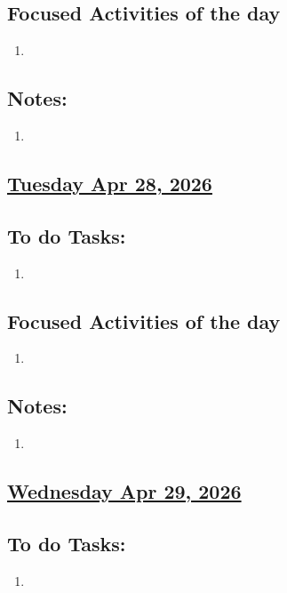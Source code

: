 \subsection*{Focused Activities of the day}
\begin{enumerate}[\ding{212}]  
    \item  
\end{enumerate}
\subsection*{Notes:}
\begin{enumerate}
    \item 
\end{enumerate}
\subsection*{\underline{Tuesday Apr 28, 2026}}
\subsection*{To do Tasks:}
\begin{enumerate}
    \item 
\end{enumerate}
\subsection*{Focused Activities of the day}
\begin{enumerate}[\ding{212}]  
    \item  
\end{enumerate}
\subsection*{Notes:}
\begin{enumerate}
    \item 
\end{enumerate}
\subsection*{\underline{Wednesday Apr 29, 2026} }
\subsection*{To do Tasks:}
\begin{enumerate}
    \item 
\end{enumerate}
